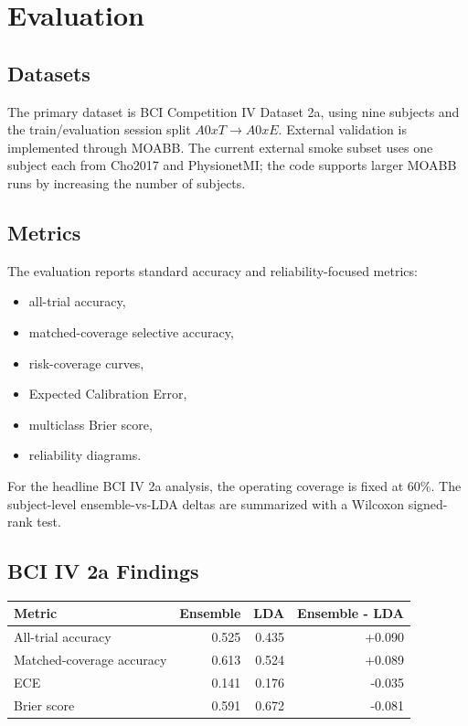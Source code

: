 \documentclass[11pt]{article}
\begin{document}
\section{Evaluation}

\subsection{Datasets}

The primary dataset is BCI Competition IV Dataset 2a, using nine subjects and
the train/evaluation session split \(A0xT \rightarrow A0xE\). External
validation is implemented through MOABB. The current external smoke subset
uses one subject each from Cho2017 and PhysionetMI; the code supports larger
MOABB runs by increasing the number of subjects.

\subsection{Metrics}

The evaluation reports standard accuracy and reliability-focused metrics:
\begin{itemize}
  \item all-trial accuracy,
  \item matched-coverage selective accuracy,
  \item risk-coverage curves,
  \item Expected Calibration Error,
  \item multiclass Brier score,
  \item reliability diagrams.
\end{itemize}
For the headline BCI IV 2a analysis, the operating coverage is fixed at
60\%. The subject-level ensemble-vs-LDA deltas are summarized with a
Wilcoxon signed-rank test.

\subsection{BCI IV 2a Findings}

\begin{center}
\begin{tabular}{lrrr}
\toprule
Metric & Ensemble & LDA & Ensemble - LDA \\
\midrule
All-trial accuracy & 0.525 & 0.435 & +0.090 \\
Matched-coverage accuracy & 0.613 & 0.524 & +0.089 \\
ECE & 0.141 & 0.176 & -0.035 \\
Brier score & 0.591 & 0.672 & -0.081 \\
\bottomrule
\end{tabular}
\end{center}
\end{document}
